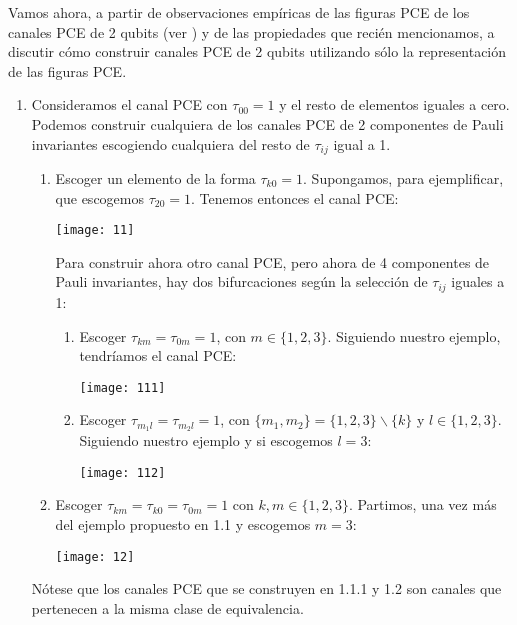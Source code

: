 Vamos ahora, a partir de observaciones empíricas de las figuras PCE 
de los canales PCE de 2 qubits (ver ) 
y de las propiedades que recién mencionamos, a discutir 
cómo construir canales PCE de 2 qubits utilizando sólo la representación
de las figuras PCE.
\begin{enumerate}
	\item Consideramos el canal PCE con $\tau_{00}=1$ y el resto de elementos
	iguales a cero. Podemos construir cualquiera de los canales PCE 
	de 2 componentes de Pauli invariantes escogiendo cualquiera del resto de 
	$\tau_{ij}$ igual a 1. 
	\begin{enumerate}
		\item Escoger un elemento de la forma $\tau_{k 0}=1$. Supongamos, 
		para ejemplificar, que escogemos $\tau_{20}=1$. Tenemos entonces 
		el canal PCE: 
		\begin{center}
			\texttt{[image: 11]}
		\end{center}
		Para construir 
		ahora otro canal PCE, pero ahora de 4 componentes de Pauli invariantes, hay
		dos bifurcaciones según la selección de $\tau_{ij}$ iguales a 1:
		\begin{enumerate}
			\item Escoger $\tau_{km}=\tau_{0m}=1$, con $m\in\{1,2,3\}$.
			Siguiendo nuestro ejemplo, tendríamos el canal PCE:
			\begin{center}
				\texttt{[image: 111]}
			\end{center}
			\item Escoger $\tau_{m_1l}=\tau_{m_2l}=1$, con 
			$\{m_1,m_2\}= \{1,2,3\}\backslash\{k\}$ y $l\in \{1,2,3\}$. 
			Siguiendo nuestro ejemplo y si escogemos $l=3$:
			\begin{center}
				\texttt{[image: 112]}
			\end{center}
		\end{enumerate}
		
		\item Escoger $\tau_{km}=\tau_{k0}=\tau_{0m}=1$ con $k,m\in\{1,2,3\}$.
		Partimos, una vez más del ejemplo propuesto en 1.1 y escogemos $m=3$:
		\begin{center}
				\texttt{[image: 12]}
			\end{center}
	\end{enumerate}
	Nótese que los canales PCE que se construyen en 1.1.1 y 1.2 son canales 
	que pertenecen a la misma clase de equivalencia.


\end{enumerate}
